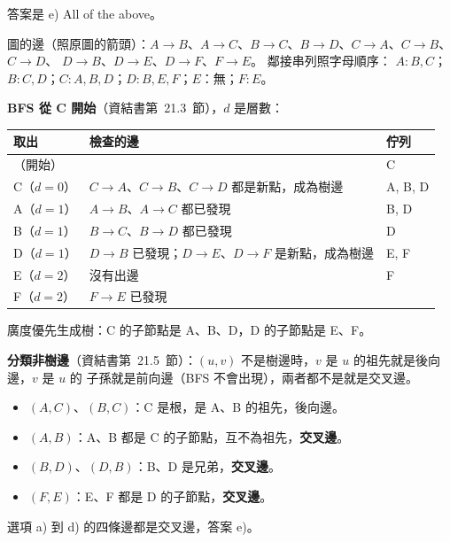 \begin{pastsoln}
答案是 e) All of the above。

圖的邊（照原圖的箭頭）：$A \to B$、$A \to C$、$B \to C$、$B \to D$、$C \to A$、$C \to B$、$C \to D$、
$D \to B$、$D \to E$、$D \to F$、$F \to E$。 鄰接串列照字母順序：
$A: B, C$；$B: C, D$；$C: A, B, D$；$D: B, E, F$；$E$：無；$F: E$。

\textbf{BFS 從 C 開始}（資結書第~21.3~節），$d$ 是層數：
\begin{center}
\small
\begin{tabular}{lll}
\toprule
取出 & 檢查的邊 & 佇列 \\
\midrule
（開始） & & C \\
C（$d = 0$） & $C \to A$、$C \to B$、$C \to D$ 都是新點，成為樹邊 & A, B, D \\
A（$d = 1$） & $A \to B$、$A \to C$ 都已發現 & B, D \\
B（$d = 1$） & $B \to C$、$B \to D$ 都已發現 & D \\
D（$d = 1$） & $D \to B$ 已發現；$D \to E$、$D \to F$ 是新點，成為樹邊 & E, F \\
E（$d = 2$） & 沒有出邊 & F \\
F（$d = 2$） & $F \to E$ 已發現 & \\
\bottomrule
\end{tabular}
\end{center}
廣度優先生成樹：C 的子節點是 A、B、D，D 的子節點是 E、F。

\textbf{分類非樹邊}（資結書第~21.5~節）：$(u, v)$ 不是樹邊時，$v$ 是 $u$ 的祖先就是後向邊，$v$ 是 $u$ 的
子孫就是前向邊（BFS 不會出現），兩者都不是就是交叉邊。
\begin{itemize}
\item $(A, C)$、$(B, C)$：C 是根，是 A、B 的祖先，後向邊。
\item $(A, B)$：A、B 都是 C 的子節點，互不為祖先，\textbf{交叉邊}。
\item $(B, D)$、$(D, B)$：B、D 是兄弟，\textbf{交叉邊}。
\item $(F, E)$：E、F 都是 D 的子節點，\textbf{交叉邊}。
\end{itemize}
選項 a) 到 d) 的四條邊都是交叉邊，答案 e)。
\end{pastsoln}
